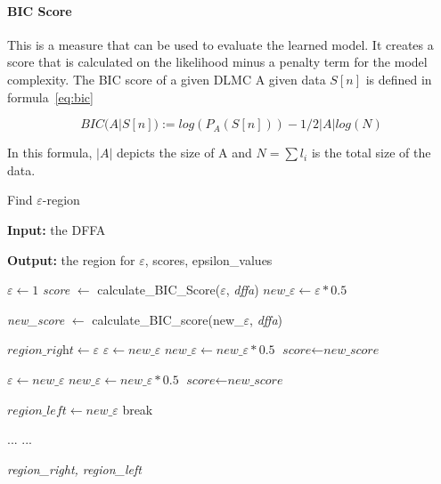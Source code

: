 \documentclass[
a4paper,
12pt
]{scrartcl}
\begin{document}
\paragraph{BIC Score} This is a measure that can be used to evaluate the learned model. It creates a score that is calculated on the likelihood minus a penalty term for the model complexity. The BIC score of a given DLMC A given data $S[n]$ is defined in formula~\ref{eq:bic}

  \begin{equation} \label{eq:bic}
  BIC(A | S[n]) := log(P_A(S[n])) - 1/2 | A | log(N)
  \end{equation}

In this formula, $|A|$ depicts the size of A and $N = \sum l_i$ is the total size of the data.

\begin{algorithm}[H]
\caption{Find $\varepsilon$-region}\label{alg:findregion}
\begin{algorithmic}[1]
\item \textbf{Input:} the DFFA
\item \textbf{Output:} the region for $\varepsilon$, scores, epsilon\_values

\State $\varepsilon \gets \textit{1}$
\State \textit{score} $\gets$ calculate\_BIC\_Score($\varepsilon$, \textit{dffa})
\State $new\_\varepsilon \gets \varepsilon * 0.5$


       \State \textit{new\_score} $\gets$ calculate\_BIC\_score(new\_$\varepsilon$, \textit{dffa})

           \label{findregion:scorelarger}
         \State $\textit{region\_right} \gets \varepsilon$
         \State $\varepsilon \gets new\_\varepsilon$
         \State $ new\_\varepsilon \gets new\_\varepsilon * 0.5$
         \State $\textit{score} \gets \textit{new\_score} $

           \label{findregion:scorethesame}
   	 \State $\varepsilon \gets new\_\varepsilon$
         \State $ new\_\varepsilon \gets new\_\varepsilon * 0.5$
         \State $\textit{score} \gets \textit{new\_score} $

      \Else \label{findregion:scoresmaller}
      \State $\textit{region\_left} \gets new\_\varepsilon$
        \State break
       \EndIf

  \EndWhile

  \State ...
  \State ...

\State \Return \textit{region\_right, region\_left}
\end{algorithmic}
\end{algorithm}
\end{document}
